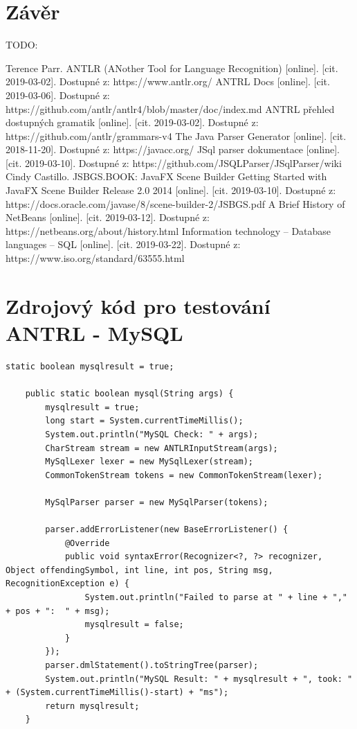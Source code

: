 \documentclass[czech,bachelor,public,dept460,male,cpdeclaration,twoside]{diploma}
\begin{document}
\section{Závěr}
TODO:


\begin{thebibliography}{99}
	 Terence Parr. ANTLR (ANother Tool for Language Recognition) [online]. [cit. 2019-03-02]. Dostupné z: https://www.antlr.org/
	 ANTRL Docs [online]. [cit. 2019-03-06]. Dostupné z: https://github.com/antlr/antlr4/blob/master/doc/index.md
	 ANTRL přehled dostupných gramatik [online]. [cit. 2019-03-02]. Dostupné z: https://github.com/antlr/grammars-v4
	 The Java Parser Generator [online]. [cit. 2018-11-20]. Dostupné z: https://javacc.org/
	 JSql parser dokumentace [online]. [cit. 2019-03-10]. Dostupné z: https://github.com/JSQLParser/JSqlParser/wiki
	 Cindy Castillo. JSBGS.BOOK: JavaFX Scene Builder Getting Started with JavaFX Scene Builder Release 2.0 2014 [online]. [cit. 2019-03-10]. Dostupné z: https://docs.oracle.com/javase/8/scene-builder-2/JSBGS.pdf
	 A Brief History of NetBeans [online]. [cit. 2019-03-12]. Dostupné z: https://netbeans.org/about/history.html
	 Information technology -- Database languages -- SQL [online]. [cit. 2019-03-22]. Dostupné z: https://www.iso.org/standard/63555.html
	
	
	
	
	
\end{thebibliography}


\appendix %
\section{Zdrojový kód pro testování ANTRL - MySQL}
\begin{lstlisting}[caption=ANTRL MySQL]
    static boolean mysqlresult = true;

    public static boolean mysql(String args) {
        mysqlresult = true;
        long start = System.currentTimeMillis();
        System.out.println("MySQL Check: " + args);
        CharStream stream = new ANTLRInputStream(args);
        MySqlLexer lexer = new MySqlLexer(stream);
        CommonTokenStream tokens = new CommonTokenStream(lexer);

        MySqlParser parser = new MySqlParser(tokens);

        parser.addErrorListener(new BaseErrorListener() {
            @Override
            public void syntaxError(Recognizer<?, ?> recognizer, Object offendingSymbol, int line, int pos, String msg, RecognitionException e) {
                System.out.println("Failed to parse at " + line + "," + pos + ":  " + msg);
                mysqlresult = false;
            }
        });
        parser.dmlStatement().toStringTree(parser);
        System.out.println("MySQL Result: " + mysqlresult + ", took: " + (System.currentTimeMillis()-start) + "ms");
        return mysqlresult;
    }
\end{lstlisting}
\end{document}
